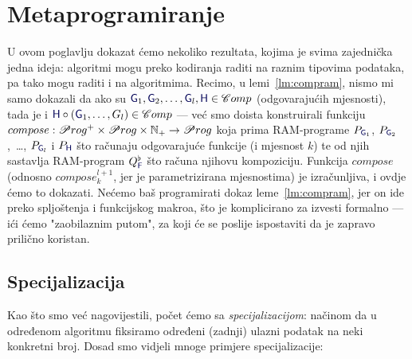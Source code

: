 \chapter{Metaprogramiranje}

U ovom poglavlju dokazat ćemo nekoliko rezultata, kojima je svima zajednička jedna ideja: algoritmi mogu preko kodiranja raditi na raznim tipovima podataka, pa tako mogu raditi i na algoritmima. Recimo, u lemi~\ref{lm:compram}, nismo mi samo dokazali da ako su $\f G_1,\f G_2,\dotsc,\f G_l,\f H\in\mathscr Comp$ (odgovarajućih mjesnosti), tada je i $\f H\circ(\f G_1,\dotsc,G_l)\in\mathscr Comp$ --- već smo doista konstruirali funkciju $compose:\mathscr Prog^+\times\mathscr Prog\times{\mathbb N}_+\to\mathscr Prog$ koja prima RAM-programe $P_{\f G_1}$, $P_{\f G_2}$,~\ldots, $P_{\f G_l}$ i $P_{\f H}$ što računaju odgovarajuće funkcije (i mjesnost $k$) te od njih sastavlja RAM-program $Q_{\f F}^\flat$ što računa njihovu kompoziciju. Funkcija $compose$ (odnosno $compose_k^{l+1}$, jer je parametrizirana mjesnostima) je izračunljiva, i ovdje ćemo to dokazati. Nećemo baš programirati dokaz leme~\ref{lm:compram}, jer on ide preko spljoštenja i funkcijskog makroa, što je komplicirano za izvesti formalno --- ići ćemo "zaobilaznim putom", za koji će se poslije ispostaviti da je zapravo prilično koristan.

\section{Specijalizacija}

Kao što smo već nagovijestili, počet ćemo sa \emph{specijalizacijom}: načinom da u od\-re\-đe\-nom algoritmu fiksiramo određeni (zadnji) ulazni podatak na neki konkretni broj. Dosad smo vidjeli mnoge primjere specijalizacije:

